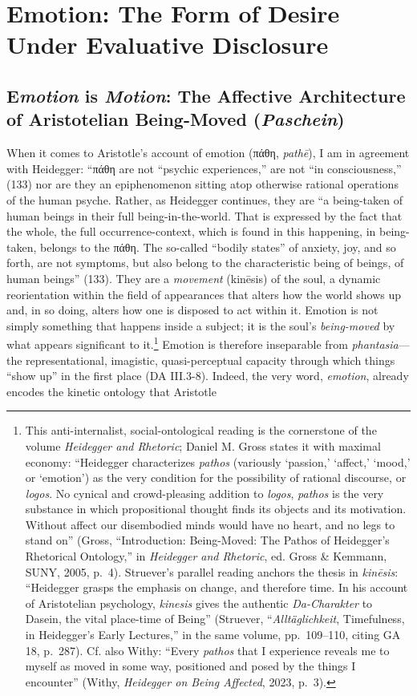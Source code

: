 \documentclass{article}
\newcommand{\gk}[1]{{\greekfont #1}}
\begin{document}
\section{Emotion: The Form of Desire Under Evaluative Disclosure}


\subsection{E\textit{motion} is \textit{Motion}: The Affective Architecture of Aristotelian Being-Moved (\textit{Paschein})}

When it comes to Aristotle’s account of emotion (\gk{πάθη}, \textit{pathē}), I am in agreement with Heidegger: ``\gk{πάθη} are not ``psychic experiences,'' are not ``in consciousness,'' (133) nor are they an epiphenomenon sitting atop otherwise rational operations of the human psyche. Rather, as Heidegger continues, they are ``a being-taken of human beings in their full being-in-the-world. That is expressed by the fact that the whole, the full occurrence-context, which is found in this happening, in being-taken, belongs to the \gk{πάθη}. The so-called ``bodily states'' of anxiety, joy, and so forth, are not symptoms, but also belong to the characteristic being of beings, of human beings'' (133). They are a \textit{movement} (kinēsis) of the soul, a dynamic reorientation within the field of appearances that alters how the world shows up and, in so doing, alters how one is disposed to act within it. Emotion is not simply something that happens inside a subject; it is the soul’s \textit{being-moved} by what appears significant to it.\footnote{This anti-internalist, social-ontological reading is the cornerstone of the volume \textit{Heidegger and Rhetoric}; Daniel M. Gross states it with maximal economy: ``Heidegger characterizes \textit{pathos} (variously `passion,' `affect,' `mood,' or `emotion') as the very condition for the possibility of rational discourse, or \textit{logos}. No cynical and crowd-pleasing addition to \textit{logos}, \textit{pathos} is the very substance in which propositional thought finds its objects and its motivation. Without affect our disembodied minds would have no heart, and no legs to stand on'' (Gross, ``Introduction: Being-Moved: The Pathos of Heidegger's Rhetorical Ontology,'' in \textit{Heidegger and Rhetoric}, ed. Gross \& Kemmann, SUNY, 2005, p.~4). Struever's parallel reading anchors the thesis in \textit{kinēsis}: ``Heidegger grasps the emphasis on change, and therefore time. In his account of Aristotelian psychology, \textit{kinesis} gives the authentic \textit{Da-Charakter} to Dasein, the vital place-time of Being'' (Struever, ``\textit{Alltäglichkeit}, Timefulness, in Heidegger's Early Lectures,'' in the same volume, pp.~109--110, citing GA 18, p.~287). Cf. also Withy: ``Every \textit{pathos} that I experience reveals me to myself as moved in some way, positioned and posed by the things I encounter'' (Withy, \textit{Heidegger on Being Affected}, 2023, p.~3).} Emotion is therefore inseparable from \textit{phantasia}—the representational, imagistic, quasi-perceptual capacity through which things “show up” in the first place (DA III.3-8). Indeed, the very word, \textit{emotion}, already encodes the kinetic ontology that Aristotle 
\end{document}
